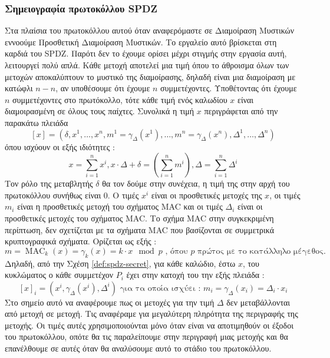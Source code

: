 \subsubsection{Σημειογραφία πρωτοκόλλου SPDZ}

Στα πλαίσια του πρωτοκόλλου αυτού όταν αναφερόμαστε σε Διαμοίραση Μυστικών εννοούμε Προσθετική Διαμοίραση Μυστικών. Το εργαλείο αυτό βρίσκεται στη καρδιά του SPDZ. Παρότι δεν το έχουμε ορίσει μέχρι στιγμής στην εργασία αυτή, λειτουργεί πολύ απλά. Κάθε μετοχή αποτελεί μια τιμή όπου το άθροισμα όλων των μετοχών αποκαλύπτουν το μυστικό της διαμοίρασης, δηλαδή είναι μια διαμοίραση με κατώφλι $n-n$, αν υποθέσουμε ότι έχουμε $n$ συμμετέχοντες. Υποθέτοντας ότι έχουμε $n$ συμμετέχοντες στο πρωτόκολλο, τότε κάθε τιμή ενός καλωδίου $x$ είναι διαμοιρασμένη σε όλους τους παίχτες. Συνολικά η τιμή $x$ περιγράφεται από την παρακάτω πλειάδα
\begin{equation}
\label{def:spdz-secret}
[ x ] = (δ, x^{1}, \ldots, x^{n}, m^{1} = γ_Δ(x^1), \ldots, m^{n} = γ_Δ(x^n), Δ^{1}, \ldots, Δ^{n})
\end{equation}
όπου ισχύουν οι εξής ιδιότητες :
\begin{equation}
    \label{def:spdz-secret-properties}
x=\sum_{i=1}^n x^{i}, x \cdot Δ + δ=(\sum_{i=1}^n m^{i}), \Delta=\sum_{i=1}^n \Delta^{i}
\end{equation}
Τον ρόλο της μεταβλητής $δ$ θα τον δούμε στην συνέχεια, η τιμή της στην αρχή του πρωτοκόλλου συνήθως είναι 0. Ο τιμές $x^i$ είναι οι προσθετικές μετοχές της $x$, οι τιμές $m_i$ είναι η προσθετικές μετοχή του σχήματος MAC και οι τιμές $Δ_i$ είναι οι προσθετικές μετοχές του σχήματος MAC. Το σχήμα MAC στην συγκεκριμένη περίπτωση, δεν σχετίζεται με τα σχήματα MAC που βασίζονται σε συμμετρικά κρυπτογραφικά σχήματα. Ορίζεται ως εξής :
\[
    m = \operatorname{MAC}_k(x) = γ_k(x) = k \cdot x \mod p \text{ , όπου $p$ πρώτος με το κατάλληλο μέγεθος.}
\]
Δηλαδή, από την Σχέση \ref{def:spdz-secret}, για κάθε καλώδιο, έστω $x$, του κυκλώματος ο κάθε συμμετέχον $P_i$ έχει στην κατοχή του την εξής πλειάδα :
\[
    [x]_i = (x^i, γ_Δ(x^i), Δ^i) \text{ για τα οποία ισχύει : } m_i = γ_Δ(x_i) = Δ_i \cdot x_i
\]
Στο σημείο αυτό να αναφέρουμε πως οι μετοχές για την τιμή $Δ$ δεν μεταβάλλονται από μετοχή σε μετοχή. Τις αναφέραμε για μεγαλύτερη πληρότητα της περιγραφής της μετοχής. Οι τιμές αυτές χρησιμοποιούνται μόνο όταν είναι να αποτιμηθούν οι έξοδοι του πρωτοκόλλου, οπότε θα τις παραλείπουμε στην περιγραφή μιας μετοχής και θα επανέλθουμε σε αυτές όταν θα αναλύσουμε αυτό το στάδιο του πρωτοκόλλου.

